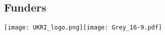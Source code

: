 \documentclass[
]{ImperialPoster}
\begin{document}
\begin{multicols}{3}
	\subsection{Funders}
	
	\texttt{[image: UKRI\_logo.png]}\hfill\texttt{[image: Grey\_16-9.pdf]} %
	

\end{multicols}

\end{document}
